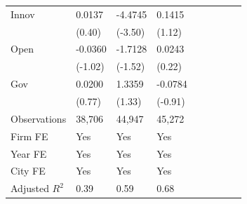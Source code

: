 \begin{table}[htbp]
\begin{tabularx}{\textwidth}{lYYYYYYYY@{}}
Innov           &   0.0137         &  -4.4745\sym{***}&   0.1415         \\
                &   (0.40)         &  (-3.50)         &   (1.12)         \\
Open            &  -0.0360         &  -1.7128         &   0.0243         \\
                &  (-1.02)         &  (-1.52)         &   (0.22)         \\
Gov             &   0.0200         &   1.3359         &  -0.0784         \\
                &   (0.77)         &   (1.33)         &  (-0.91)         \\
\hline
Observations    &   38,706         &   44,947         &   45,272         \\
Firm FE         &      Yes         &      Yes         &      Yes         \\
Year FE         &      Yes         &      Yes         &      Yes         \\
City FE         &      Yes         &      Yes         &      Yes         \\
Adjusted $ R^2$ &     0.39         &     0.59         &     0.68         \\
\bottomrule
\end{tabularx}
\end{table}
